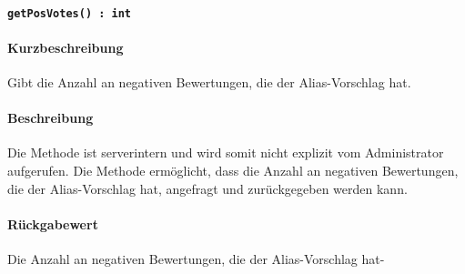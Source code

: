 \paragraph{\texttt{getPosVotes() : int}}%
\paragraph*{Kurzbeschreibung}
Gibt die Anzahl an negativen Bewertungen, die der Alias-Vorschlag hat.
\paragraph*{Beschreibung}
Die Methode ist serverintern und wird somit nicht explizit vom Administrator aufgerufen.
Die Methode ermöglicht, dass die Anzahl an negativen Bewertungen, die der Alias-Vorschlag hat, angefragt und zurückgegeben werden kann.
\paragraph*{Rückgabewert}
Die Anzahl an negativen Bewertungen, die der Alias-Vorschlag hat-
